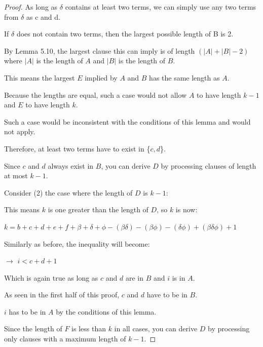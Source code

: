 \documentclass[manuscript]{acmart}
\begin{document}
\begin{proof}
        As long as $\delta$ contains at least two terms, we can simply use 
        any two terms from $\delta$ as c and d.

        If $\delta$ does not contain two terms, then the largest possible
        length of B is 2.
        
        By Lemma 5.10, the largest clause this can imply is of length 
        $(|A| + |B| - 2)$ where $|A|$ is the length of $A$ and $|B|$ is the length 
        of $B$.

        This means the largest $E$ implied by $A$ and $B$ has the same 
        length as $A$.

        Because the lengths are equal, such a case would not allow $A$ to 
        have length $k - 1$ and $E$ to have length $k$.

        Such a case would be inconsistent with the conditions of this 
        lemma and would not apply.
        
        Therefore, at least two terms have to exist in \{$c, d$\}.

        Since $c$ and $d$ always exist in $B$, you can derive $D$ by processing
        clauses of length at most $k-1$.
    
        Consider (2) the case where the length of $D$ is $k - 1$:

        This means $k$ is one greater than the length of $D$, so $k$ is now:

        $k = b + c + d + e + f + \beta + \delta + \phi - (\beta \delta) - 
        (\beta \phi) - (\delta \phi) + (\beta \delta \phi) + 1$

        Similarly as before, the inequality will become:

        $\rightarrow$ $i < c + d + 1$

        Which is again true as long as $c$ and $d$ are in $B$ and $i$ is in $A$.

        As seen in the first half of this proof, $c$ and $d$ have to be in
        $B$.

        $i$ has to be in $A$ by the conditions of this lemma.

        Since the length of $F$ is less than $k$ in all cases, you can derive
        $D$ by processing only clauses with a maximum length of $k-1$.
    \end{proof}
\end{document}
